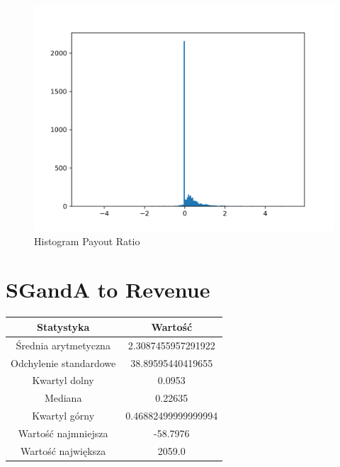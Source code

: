 \documentclass{article}
\begin{document}
\begin{figure}[h!]
    \includegraphics[width=\linewidth]{variables/Payout Ratio.png}
    \caption{Histogram Payout Ratio }
\end{figure}\section{ SGandA to Revenue }

\begin{center}
    \begin{tabular}{|c | c|} 
    \hline
    Statystyka & Wartość \\
    \hline\hline
    Średnia arytmetyczna & 2.3087455957291922 \\ 
    \hline
    Odchylenie standardowe & 38.89595440419655 \\
    \hline
    Kwartyl dolny & 0.0953 \\
    \hline
    Mediana & 0.22635 \\
    \hline
    Kwartyl górny & 0.46882499999999994 \\
    \hline
    Wartość najmniejsza & -58.7976 \\
    \hline
    Wartość największa & 2059.0 \\
    \hline
   \end{tabular}
\end{center}
\end{document}
